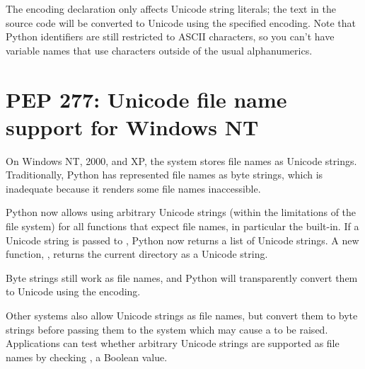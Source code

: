 \documentclass{howto}
\begin{document}
The encoding declaration only affects Unicode string literals; the
text in the source code will be converted to Unicode using the
specified encoding.  Note that Python identifiers are still restricted
to ASCII characters, so you can't have variable names that use
characters outside of the usual alphanumerics.

\begin{seealso}


\end{seealso}


\section{PEP 277: Unicode file name support for Windows NT}

On Windows NT, 2000, and XP, the system stores file names as Unicode
strings. Traditionally, Python has represented file names as byte
strings, which is inadequate because it renders some file names
inaccessible.

Python now allows using arbitrary Unicode strings (within the
limitations of the file system) for all functions that expect file
names, in particular the  built-in. If a Unicode
string is passed to , Python now returns a list
of Unicode strings.  A new function, , returns
the current directory as a Unicode string.

Byte strings still work as file names, and Python will transparently
convert them to Unicode using the  encoding.

Other systems also allow Unicode strings as file names, but convert
them to byte strings before passing them to the system which may cause
a  to be raised. Applications can test whether
arbitrary Unicode strings are supported as file names by checking
, a Boolean value.

\begin{seealso}


\end{seealso}
\end{document}
